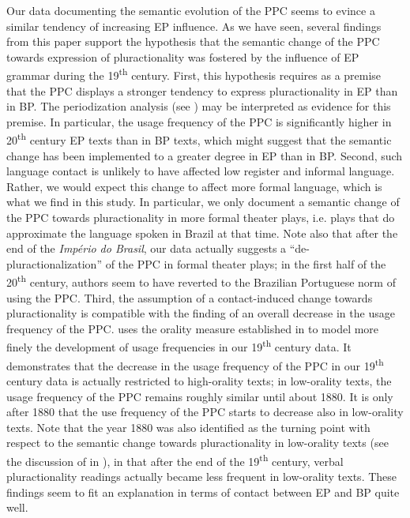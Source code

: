 \documentclass[output=paper,colorlinks,citecolor=brown]{langscibook}
\begin{document}
Our data documenting the semantic evolution of the PPC seems to evince a similar tendency of increasing EP influence. As we have seen, several findings from this paper support the hypothesis that the semantic change of the PPC towards expression of pluractionality was fostered by the influence of EP grammar during the 19\textsuperscript{th} century. First, this hypothesis requires as a premise that the PPC displays a stronger tendency to express pluractionality in EP than in BP. The periodization analysis (see ) may be interpreted as evidence for this premise. In particular, the usage frequency of the PPC is significantly higher in 20\textsuperscript{th} century EP texts than in BP texts, which might suggest that the semantic change has been implemented to a greater degree in EP than in BP. Second, such language contact is unlikely to have affected low register and informal language. Rather, we would expect this change to affect more formal language, which is what we find in this study. In particular, we only document a semantic change of the PPC towards pluractionality in more formal theater plays, i.e. plays that do approximate the language spoken in Brazil at that time. Note also that after the end of the \textit{Império do Brasil}, our data actually suggests a “de-pluractionalization” of the PPC in formal theater plays; in the first half of the 20\textsuperscript{th} century, authors seem to have reverted to the Brazilian Portuguese norm of using the PPC. Third, the assumption of a contact-induced change towards pluractionality is compatible with the finding of an overall decrease in the usage frequency of the PPC.   uses the orality measure established in   to model more finely the development of usage frequencies in our 19\textsuperscript{th} century data. It demonstrates that the decrease in the usage frequency of the PPC in our 19\textsuperscript{th} century data is actually restricted to high-orality texts; in low-orality texts, the usage frequency of the PPC remains roughly similar until about 1880. It is only after 1880 that the use frequency of the PPC starts to decrease also in low-orality texts. Note that the year 1880 was also identified as the turning point with respect to the semantic change towards pluractionality in low-orality texts (see the discussion of   in  ), in that after the end of the 19\textsuperscript{th} century, verbal pluractionality readings actually became less frequent in low-orality texts. These findings seem to fit an explanation in terms of contact between EP and BP quite well.
\end{document}
